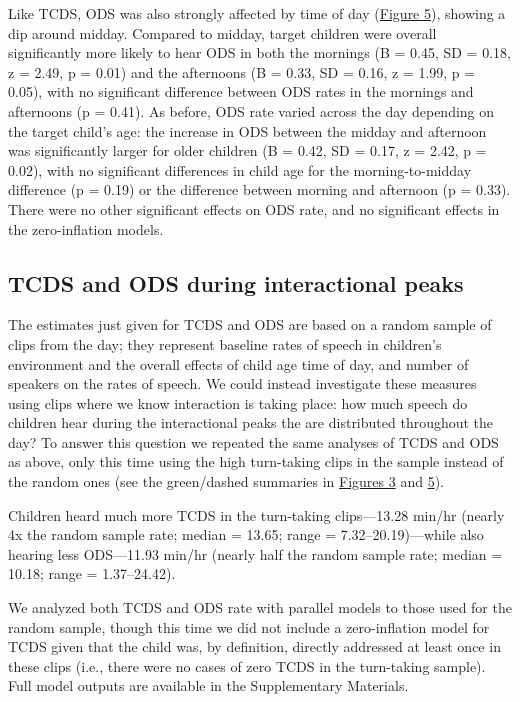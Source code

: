 \documentclass[floatsintext,man]{apa6}
\theoremstyle{definition}
\theoremstyle{definition}
\theoremstyle{definition}
\theoremstyle{remark}
\begin{document}
Like TCDS, ODS was also strongly affected by time of day
(\protect\hyperlink{fig5}{Figure 5}), showing a dip around midday.
Compared to midday, target children were overall significantly more
likely to hear ODS in both the mornings (B = 0.45, SD = 0.18, z = 2.49,
p = 0.01) and the afternoons (B = 0.33, SD = 0.16, z = 1.99, p = 0.05),
with no significant difference between ODS rates in the mornings and
afternoons (p = 0.41). As before, ODS rate varied across the day
depending on the target child's age: the increase in ODS between the
midday and afternoon was significantly larger for older children (B =
0.42, SD = 0.17, z = 2.42, p = 0.02), with no significant differences in
child age for the morning-to-midday difference (p = 0.19) or the
difference between morning and afternoon (p = 0.33). There were no other
significant effects on ODS rate, and no significant effects in the
zero-inflation models.

\subsection{TCDS and ODS during interactional
peaks}\label{tcds-and-ods-during-interactional-peaks}

The estimates just given for TCDS and ODS are based on a random sample
of clips from the day; they represent baseline rates of speech in
children's environment and the overall effects of child age time of day,
and number of speakers on the rates of speech. We could instead
investigate these measures using clips where we know interaction is
taking place: how much speech do children hear during the interactional
peaks the are distributed throughout the day? To answer this question we
repeated the same analyses of TCDS and ODS as above, only this time
using the high turn-taking clips in the sample instead of the random
ones (see the green/dashed summaries in \protect\hyperlink{fig3}{Figures
3} and \protect\hyperlink{fig5}{5}).

Children heard much more TCDS in the turn-taking clips---13.28 min/hr
(nearly 4x the random sample rate; median = 13.65; range =
7.32--20.19)---while also hearing less ODS---11.93 min/hr (nearly half
the random sample rate; median = 10.18; range = 1.37--24.42).

We analyzed both TCDS and ODS rate with parallel models to those used
for the random sample, though this time we did not include a
zero-inflation model for TCDS given that the child was, by definition,
directly addressed at least once in these clips (i.e., there were no
cases of zero TCDS in the turn-taking sample). Full model outputs are
available in the Supplementary Materials.
\end{document}
